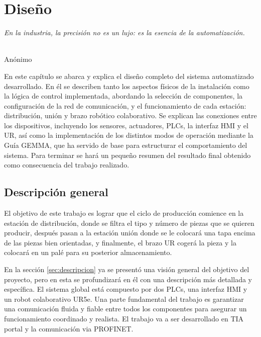 \chapter{Diseño}
\label{cap:capitulo4}

\begin{flushright}
\begin{minipage}[]{10cm}
\emph{En la industria, la precisión no es un lujo: es la esencia de la automatización.}\\
\end{minipage}\\

Anónimo \\
\end{flushright}

\vspace{1cm}

En este capítulo se abarca y explica el diseño completo del sistema automatizado desarrollado. En él se describen tanto los aspectos físicos de la instalación como la lógica de control implementada, abordando la selección de componentes, la configuración de la red de comunicación, y el funcionamiento de cada estación: distribución, unión y brazo robótico colaborativo. Se explican las conexiones entre los dispositivos, incluyendo los sensores, actuadores, PLCs, la interfaz HMI y el UR, así como la implementación de los distintos modos de operación mediante la Guía GEMMA, que ha servido de base para estructurar el comportamiento del sistema. Para terminar se hará un pequeño resumen del resultado final obtenido como consecuencia del trabajo realizado.

\section{Descripción general}
\label{sec:descripcion_general}

El objetivo de este trabajo es lograr que el ciclo de producción comience en la estación de distribución, donde se filtra el tipo y número de piezas que se quieren producir, después pasan a la estación unión donde se le colocará una tapa encima de las piezas bien orientadas, y finalmente, el brazo UR cogerá la pieza y la colocará en un palé para su posterior almacenamiento. 

En la sección \ref{sec:descripcion} ya se presentó una visión general del objetivo del proyecto, pero en esta se profundizará en él con una descripción más detallada y específica. El sistema global está compuesto por dos PLCs, una interfaz HMI y un robot colaborativo UR5e. Una parte fundamental del trabajo es garantizar una comunicación fluida y fiable entre todos los componentes para asegurar un funcionamiento coordinado y realista. El trabajo va a ser desarrollado en TIA portal y la comunicación via PROFINET. \\

